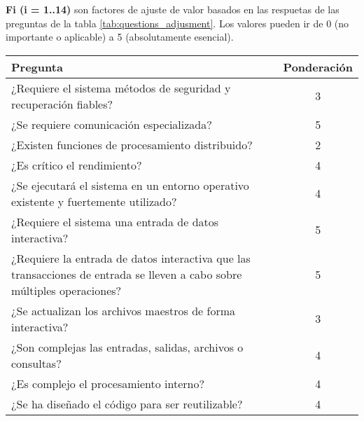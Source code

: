 	\textbf{Fi (i = 1..14)} son factores de ajuste de valor basados en las respuetas de las preguntas de la tabla \ref{tab:questions_adjusment}. Los valores pueden ir de 0 (no importante o aplicable) a 5 (absolutamente esencial).

	\begin{table}[h!]
		\begin{tabular}{|p{9cm}|c|}
		\hline
		Pregunta                                                                                                                 & Ponderación \\ \hline
		¿Requiere el sistema métodos de seguridad y recuperación fiables?                                                       & 3           \\ \hline
		¿Se requiere comunicación especializada?                                                                              & 5           \\ \hline
		¿Existen funciones de procesamiento distribuido?                                                                         & 2           \\ \hline
		¿Es crítico el rendimiento?                                                                                              & 4           \\ \hline
		¿Se ejecutará el sistema en un entorno operativo existente y fuertemente utilizado?                                      & 4           \\ \hline
		¿Requiere el sistema una entrada de datos interactiva?                                                                    & 5           \\ \hline
		¿Requiere la entrada de datos interactiva que las transacciones de entrada se lleven a cabo sobre múltiples operaciones? & 5           \\ \hline
		¿Se actualizan los archivos maestros de forma interactiva?                                                               & 3           \\ \hline
		¿Son complejas las entradas, salidas, archivos o consultas?                                                               & 4           \\ \hline
		¿Es complejo el procesamiento interno?                                                                                   & 4           \\ \hline
		¿Se ha diseñado el código para ser reutilizable?                                                                         & 4           \\ \hline

\end{tabular}
\end{table}
